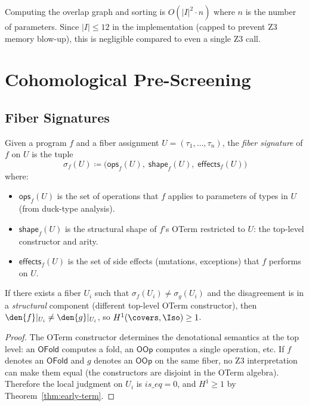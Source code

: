 \begin{remark}[Complexity]
Computing the overlap graph and sorting is $O(|I|^2 \cdot n)$ where
$n$ is the number of parameters.  Since $|I| \leq 12$ in the
implementation (capped to prevent Z3 memory blow-up), this is
negligible compared to even a single Z3 call.
\end{remark}


\section{Cohomological Pre-Screening}
\label{sec:cohomological-prescreen}

\subsection{Fiber Signatures}

\begin{definition}
\label{def:fiber-signature}
Given a program $f$ and a fiber assignment $U = (\tau_1, \ldots, \tau_n)$,
the \emph{fiber signature} of $f$ on $U$ is the tuple
\[
  \sigma_f(U) \coloneqq \bigl(
    \mathsf{ops}_f(U),\;
    \mathsf{shape}_f(U),\;
    \mathsf{effects}_f(U)
  \bigr)
\]
where:
\begin{itemize}
  \item $\mathsf{ops}_f(U)$ is the set of operations that $f$ applies
    to parameters of types in $U$ (from duck-type analysis).
  \item $\mathsf{shape}_f(U)$ is the structural shape of $f$'s OTerm
    restricted to $U$: the top-level constructor and arity.
  \item $\mathsf{effects}_f(U)$ is the set of side effects
    (mutations, exceptions) that $f$ performs on $U$.
\end{itemize}
\end{definition}

\begin{theorem}
\label{thm:prescreen-neq}
If there exists a fiber $U_i$ such that
$\sigma_f(U_i) \neq \sigma_g(U_i)$ and the disagreement is in a
\emph{structural} component (different top-level OTerm constructor),
then $\den{f}|_{U_i} \neq \den{g}|_{U_i}$, so
$H^1(\covers, \Iso) \geq 1$.
\end{theorem}

\begin{proof}
The OTerm constructor determines the denotational semantics at the
top level: an $\mathsf{OFold}$ computes a fold, an $\mathsf{OOp}$
computes a single operation, etc.  If $f$ denotes an $\mathsf{OFold}$
and $g$ denotes an $\mathsf{OOp}$ on the same fiber, no Z3
interpretation can make them equal (the constructors are disjoint
in the OTerm algebra).  Therefore the local judgment on $U_i$ is
$\mathit{is\_eq} = 0$, and $H^1 \geq 1$ by
Theorem~\ref{thm:early-term}.
\end{proof}


